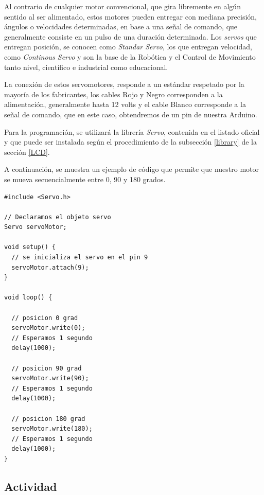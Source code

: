 \documentclass[letterpaper, 10pt]{report}
\begin{document}
Al contrario de cualquier motor convencional, que gira libremente en algún sentido al ser alimentado, estos motores pueden entregar con mediana precisión, ángulos o velocidades determinadas, en base a una señal de comando, que generalmente consiste en un pulso de una duración determinada. Los \emph{servos} que entregan posición, se conocen como \emph{Standar Servo}, los que entregan velocidad, como \emph{Continous Servo} y son la base de la Robótica y el Control de Movimiento tanto nivel, científico e industrial como  educacional.

La conexión de estos servomotores, responde a un estándar respetado por la mayoría de los fabricantes, los cables Rojo y Negro corresponden a la alimentación, generalmente hasta 12 volts y el cable Blanco corresponde a la señal de comando, que en este caso, obtendremos de un pin de nuestra Arduino.

Para la programación, se utilizará la librería \emph{Servo}, contenida en el listado oficial y que puede ser instalada según el procedimiento de la subsección \ref{library} de la sección \ref{LCD}.

A continuación, se muestra un ejemplo de código que permite que nuestro motor se mueva secuencialmente entre 0, 90 y 180 grados.
\\
\begin{lstlisting}[style=myArduino]
#include <Servo.h>
 
// Declaramos el objeto servo
Servo servoMotor;
 
void setup() { 
  // se inicializa el servo en el pin 9
  servoMotor.attach(9);
}
 
void loop() {
  
  // posicion 0 grad
  servoMotor.write(0);
  // Esperamos 1 segundo
  delay(1000);
  
  // posicion 90 grad
  servoMotor.write(90);
  // Esperamos 1 segundo
  delay(1000);
  
  // posicion 180 grad
  servoMotor.write(180);
  // Esperamos 1 segundo
  delay(1000);
}
\end{lstlisting}

\subsection{Actividad}
\end{document}
